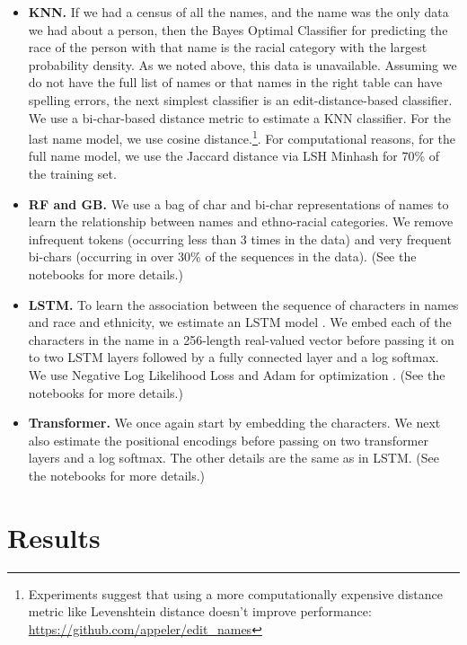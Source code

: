 \documentclass[12pt, letterpaper]{article}
\begin{document}
\begin{itemize}

    \item \textbf{KNN.} If we had a census of all the names, and the name was the only data we had about a person, then the Bayes Optimal Classifier for predicting the race of the person with that name is the racial category with the largest probability density. As we noted above, this data is unavailable. Assuming we do not have the full list of names or that names in the right table can have spelling errors, the next simplest classifier is an edit-distance-based classifier. We use a bi-char-based distance metric to estimate a KNN classifier. For the last name model, we use cosine distance.\footnote{Experiments suggest that using a more computationally expensive distance metric like Levenshtein distance doesn't improve performance: \url{https://github.com/appeler/edit_names}}. For computational reasons, for the full name model, we use the Jaccard distance via LSH Minhash for 70\% of the training set.

    \item \textbf{RF and GB.} We use a bag of char and bi-char representations of names to learn the relationship between names and ethno-racial categories. We remove infrequent tokens (occurring less than 3 times in the data) and very frequent bi-chars (occurring in over 30\% of the sequences in the data). (See the notebooks for more details.)
    
    \item \textbf{LSTM.} To learn the association between the sequence of characters in names and race and ethnicity, we estimate an LSTM model \citep{graves2005framewise, gers1999learning}. We embed each of the characters in the name in a 256-length real-valued vector before passing it on to two LSTM layers followed by a fully connected layer and a log softmax. We use Negative Log Likelihood Loss and Adam for optimization \citep{kingma2014adam}. (See the notebooks for more details.)

    \item \textbf{Transformer.} We once again start by embedding the characters. We next also estimate the positional encodings before passing on two transformer layers and a log softmax. The other details are the same as in LSTM. (See the notebooks for more details.)
    
    \end{itemize}

\section*{Results}
\end{document}
